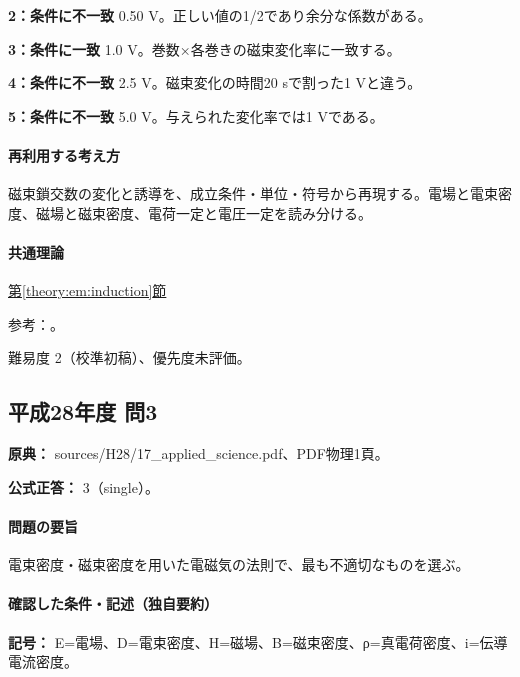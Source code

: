 \noindent\textbf{2：条件に不一致} 0.50 V。正しい値の1/2であり余分な係数がある。\par

\noindent\textbf{3：条件に一致} 1.0 V。巻数×各巻きの磁束変化率に一致する。\par

\noindent\textbf{4：条件に不一致} 2.5 V。磁束変化の時間20 sで割った1 Vと違う。\par

\noindent\textbf{5：条件に不一致} 5.0 V。与えられた変化率では1 Vである。\par

\paragraph{再利用する考え方} 磁束鎖交数の変化と誘導を、成立条件・単位・符号から再現する。電場と電束密度、磁場と磁束密度、電荷一定と電圧一定を読み分ける。

\paragraph{共通理論} \hyperref[theory:em:induction]{第\ref*{theory:em:induction}節}

\par 参考：\cite{mit_em10}。

\par 難易度 2（校準初稿）、優先度未評価。

\subsection{平成28年度 問3}
\label{q:h28-reg-applied-03}

\noindent\textbf{原典：} sources/H28/17\_applied\_science.pdf、PDF物理1頁。

\textbf{公式正答：} 3（single）。

\paragraph{問題の要旨} 電束密度・磁束密度を用いた電磁気の法則で、最も不適切なものを選ぶ。

\paragraph{確認した条件・記述（独自要約）}\mbox{}\par

\noindent\textbf{記号：} E=電場、D=電束密度、H=磁場、B=磁束密度、ρ=真電荷密度、i=伝導電流密度。\par

